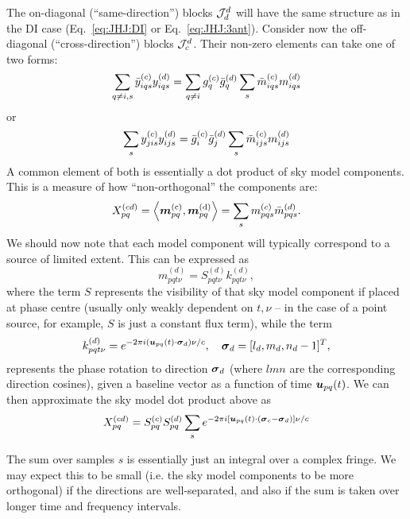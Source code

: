 \documentclass[useAMS,usenatbib]{mn2e}
\numberwithin{equation}{section} %
\begin{document}
The on-diagonal (``same-direction'') blocks $\mathcal{J}^d_d$ will have the same structure as in the DI 
case (Eq.~\ref{eq:JHJ:DI} or Eq.~\ref{eq:JHJ:3ant}). Consider now the off-diagonal (``cross-direction'') 
blocks $\mathcal{J}^d_c$. Their non-zero elements can take one of two forms:
\begin{equation}
  \sum\limits_{q\ne i,s} \bar{y}^{(c)}_{iqs} y^{(d)}_{iqs} = \sum\limits_{q\ne i} g^{(c)}_q \bar{g}^{(d)}_q \sum_s \bar{m}^{(c)}_{iqs} m^{(d)}_{iqs}
\end{equation}
or
\begin{equation}
  \sum\limits_{s} y^{(c)}_{jis} y^{(d)}_{ijs} = \bar{g}^{(c)}_i \bar{g}^{(d)}_j \sum_s \bar{m}^{(c)}_{ijs} m^{(d)}_{ijs}
\label{eq:JHJ:DD:crossterms}
\end{equation}
A common element of both is essentially a dot product of sky model components. This is a 
measure of how ``non-orthogonal'' the components are:
\begin{equation}
\label{eq:Xpqcd}
X_{pq}^{(cd)} = \left \langle \bmath{m}_{pq}^\mathrm{(c)},\bmath{m}^\mathrm{(d)}_{pq} \right \rangle = \sum_s \mmc_{pqs} \mmdH_{pqs}.
\end{equation}
We should now note that each model component will typically correspond to a source of limited extent. This can be 
expressed as
\begin{equation}
m_{pqt\nu}^{(d)} = S^{(d)}_{pqt\nu} k^{(d)}_{pqt\nu}, 
\end{equation}
where the term $S$ represents the visibility of that sky model component if placed at phase centre (usually 
only weakly dependent on $t,\nu$ -- in the case of a point source, for example, $S$ is just a constant flux term),
while the term
\begin{equation}
k^{(d)}_{pqt\nu} = e^{-2\pi i (\bmath{u}_{pq}(t)\cdot\bmath{\sigma}_d)\nu/c},~~~\bmath{\sigma}_d = [l_d,m_d,n_d-1]^T,
\end{equation}
represents the phase rotation to direction $\bmath{\sigma}_d$ (where $lmn$ are the corresponding direction cosines), 
given a baseline vector as a function of time $\bmath{u}_{pq}(t)$. We can then approximate the sky model dot product above as
\begin{equation}
X_{pq}^{(cd)} = S^{(c)}_{pq}S^{(d)}_{pq} \sum_s e^{-2\pi i [\bmath{u}_{pq}(t)\cdot(\bmath{\sigma}_c-\bmath{\sigma}_d) ]\nu/c}
\end{equation}

The sum over samples $s$ is essentially just an integral over a complex fringe. We may expect this to be small (i.e. the
sky model components to be more orthogonal) if the directions are well-separated, and also if the sum is taken 
over longer time and frequency intervals. 
\end{document}
